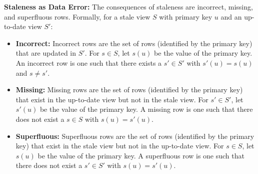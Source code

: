 \noindent \textbf{Staleness as Data Error:} The consequences of staleness are incorrect, missing, and superfluous rows. 
Formally, for a stale view $S$ with primary key $u$ and an up-to-date view $S'$:
\begin{itemize}[noitemsep] \sloppy
	\item \textbf{Incorrect: } Incorrect rows are the set of rows (identified by the primary key) that are updated in $S'$. For $s \in S$, let $s(u)$ be the value of the primary key. An incorrect row is one such that there exists a $s' \in S'$ with $s'(u) = s(u)$ and $s \ne s'$.
	\item \textbf{Missing: } Missing rows are the set of rows (identified by the primary key) that exist in the up-to-date view but not in the stale view. For $s' \in S'$, let $s'(u)$ be the value of the primary key. A missing row is one such that there does not exist a $s \in S$ with $s(u) = s'(u)$.
	\item \textbf{Superfluous: } Superfluous rows are the set of rows (identified by the primary key) that exist in the stale view but not in the up-to-date view. For $s \in S$, let $s(u)$ be the value of the primary key. A superfluous row is one such that there does not exist a $s' \in S'$ with $s(u) = s'(u)$.
\end{itemize}

\vspace{.25em}

